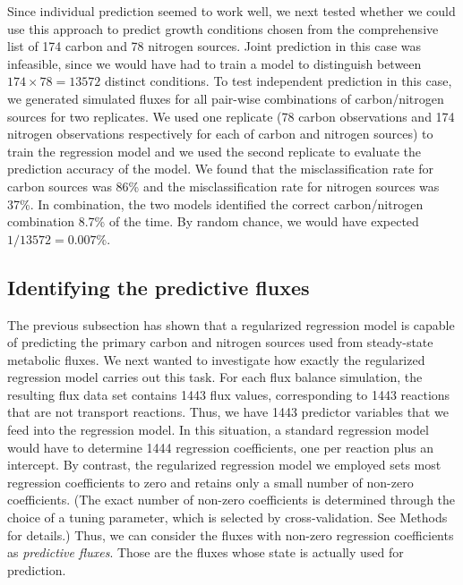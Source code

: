 \documentclass[12pt]{article}
\begin{document}
Since individual prediction seemed to work well, we next tested whether we could use this approach to predict growth conditions chosen from the comprehensive list of 174 carbon and 78 nitrogen sources. Joint prediction in this case was infeasible, since we would have had to train a model to distinguish between $174\times78=13572$ distinct conditions. To test independent prediction in this case, we generated simulated fluxes for all pair-wise combinations of carbon/nitrogen sources for two replicates. We used one replicate (78 carbon observations and 174 nitrogen observations respectively for each of carbon and nitrogen sources) to train the regression model and we used the second replicate to evaluate the prediction accuracy of the model. We found that the misclassification rate for carbon sources was 86\% and the misclassification rate for nitrogen sources was 37\%. In combination, the two models identified the correct carbon/nitrogen combination 8.7\% of the time. By random chance, we would have expected $1/13572=0.007\%$.


\subsection{Identifying the predictive fluxes}

The previous subsection has shown that a regularized regression model is capable of predicting the primary carbon and nitrogen sources used from steady-state metabolic fluxes. We next wanted to investigate how exactly the regularized regression model carries out this task. For each flux balance simulation, the resulting flux data set contains 1443 flux values, corresponding to 1443 reactions that are not transport reactions. Thus, we have 1443 predictor variables that we feed into the regression model. In this situation, a standard regression model would have to determine 1444 regression coefficients, one per reaction plus an intercept. By contrast, the regularized regression model we employed sets most regression coefficients to zero and retains only a small number of non-zero coefficients. (The exact number of non-zero coefficients is determined through the choice of a tuning parameter, which is selected by cross-validation. See Methods for details.) Thus, we can consider the fluxes with non-zero regression coefficients as \emph{predictive fluxes}. Those are the fluxes whose state is actually used for prediction.
\end{document}
